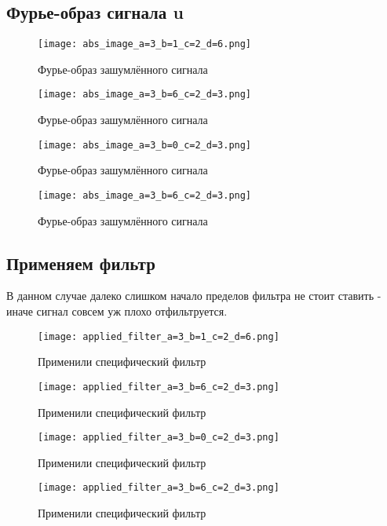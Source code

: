 \subsection{Фурье-образ сигнала u}


\begin{figure}[ht]
    \centering
    \texttt{[image: abs\_image\_a=3\_b=1\_c=2\_d=6.png]}
    \caption{Фурье-образ зашумлённого сигнала}
\end{figure}

\begin{figure}[ht]
    \centering
    \texttt{[image: abs\_image\_a=3\_b=6\_c=2\_d=3.png]}
    \caption{Фурье-образ зашумлённого сигнала}
\end{figure}

\begin{figure}[ht]
    \centering
    \texttt{[image: abs\_image\_a=3\_b=0\_c=2\_d=3.png]}
    \caption{Фурье-образ зашумлённого сигнала}
\end{figure}

\begin{figure}[ht]
    \centering
    \texttt{[image: abs\_image\_a=3\_b=6\_c=2\_d=3.png]}
    \caption{Фурье-образ зашумлённого сигнала}
\end{figure}

\newpage
\subsection{Применяем фильтр}
В данном случае далеко слишком начало пределов фильтра не стоит ставить - иначе сигнал совсем уж плохо отфильтруется.
\begin{figure}[ht]
    \centering
    \texttt{[image: applied\_filter\_a=3\_b=1\_c=2\_d=6.png]}
    \caption{Применили специфический фильтр}
\end{figure}

\begin{figure}[ht]
    \centering
    \texttt{[image: applied\_filter\_a=3\_b=6\_c=2\_d=3.png]}
    \caption{Применили специфический фильтр}
\end{figure}

\begin{figure}[ht]
    \centering
    \texttt{[image: applied\_filter\_a=3\_b=0\_c=2\_d=3.png]}
    \caption{Применили специфический фильтр}
\end{figure}

\begin{figure}[ht]
    \centering
    \texttt{[image: applied\_filter\_a=3\_b=6\_c=2\_d=3.png]}
    \caption{Применили специфический фильтр}
\end{figure}

